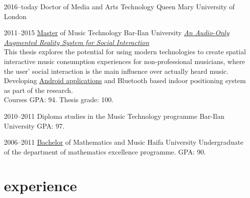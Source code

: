 \documentclass[]{friggeri-cv}  %
\begin{document}
\begin{entrylist}

    \entry
    {2016--today}
    {Doctor {\normalfont of Media and Arts Technology}}
    {Queen Mary University of London}
    {}

    \entry
    {2011--2015}
    {\href{http://www.tomgurion.me/pdfs/MA.pdf}{Master} {\normalfont of Music Technology}}
    {Bar-Ilan University}
    {\href{http://www.tomgurion.me/an-audio-only-augmented-reality-system-for-social-interaction.html}{\emph{An Audio-Only Augmented Reality System for Social Interaction}}\\
    This thesis explores the potential for using modern technologies to create spatial interactive music consumption experiences for non-professional musicians, where the user' social interaction is the main influence over actually heard music.\\
    Developing \href{https://github.com/Nagasaki45/ScenePlayer-Plus/}{Android applications} and Bluetooth based indoor positioning system as part of the research.\\
    Courses GPA: 94. Thesis grade: 100.}

\end{entrylist}
\begin{entrylist}

    \entry
    {2010--2011}
    {Diploma studies {\normalfont in the Music Technology programme}}
    {Bar-Ilan University}
    {GPA: 97.}

\end{entrylist}
\begin{entrylist}

    \entry
    {2006--2011}
    {\href{http://www.tomgurion.me/pdfs/BSc.pdf}{Bachelor} {\normalfont of Mathematics and Music}}
    {Haifa University}
    {Undergraduate of the department of mathematics excellence programme. GPA: 90.}

\end{entrylist}


\section{experience}
\end{document}
